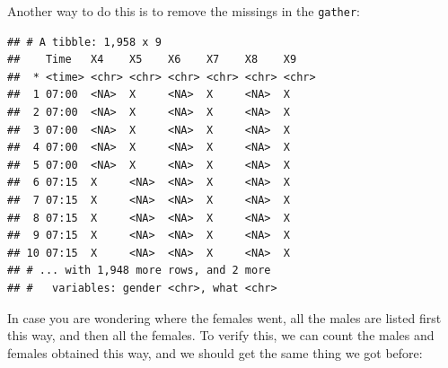 \documentclass[]{tufte-book}
\newenvironment{Shaded}{}{}
\newcommand{\DataTypeTok}[1]{\textcolor[rgb]{0.56,0.13,0.00}{#1}}
\newcommand{\KeywordTok}[1]{\textcolor[rgb]{0.00,0.44,0.13}{\textbf{#1}}}
\newcommand{\NormalTok}[1]{#1}
\newcommand{\OperatorTok}[1]{\textcolor[rgb]{0.40,0.40,0.40}{#1}}
\newcommand{\StringTok}[1]{\textcolor[rgb]{0.25,0.44,0.63}{#1}}
\theoremstyle{definition}
\theoremstyle{definition}
\theoremstyle{definition}
\theoremstyle{remark}
\begin{document}
Another way to do this is to remove the missings in the \texttt{gather}:

\begin{Shaded}
\end{Shaded}

\begin{verbatim}
## # A tibble: 1,958 x 9
##    Time   X4    X5    X6    X7    X8    X9   
##  * <time> <chr> <chr> <chr> <chr> <chr> <chr>
##  1 07:00  <NA>  X     <NA>  X     <NA>  X    
##  2 07:00  <NA>  X     <NA>  X     <NA>  X    
##  3 07:00  <NA>  X     <NA>  X     <NA>  X    
##  4 07:00  <NA>  X     <NA>  X     <NA>  X    
##  5 07:00  <NA>  X     <NA>  X     <NA>  X    
##  6 07:15  X     <NA>  <NA>  X     <NA>  X    
##  7 07:15  X     <NA>  <NA>  X     <NA>  X    
##  8 07:15  X     <NA>  <NA>  X     <NA>  X    
##  9 07:15  X     <NA>  <NA>  X     <NA>  X    
## 10 07:15  X     <NA>  <NA>  X     <NA>  X    
## # ... with 1,948 more rows, and 2 more
## #   variables: gender <chr>, what <chr>
\end{verbatim}

In case you are wondering where the females went, all the males are
listed first this way, and then all the females. To verify this, we can
count the males and females obtained this way, and we should get the
same thing we got before:

\begin{Shaded}
\end{Shaded}
\end{document}
